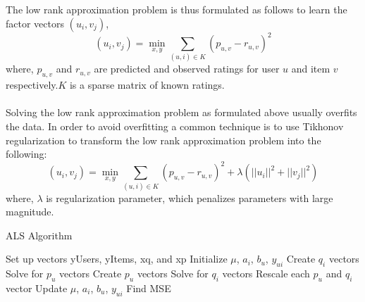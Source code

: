 \documentclass{sig-alternate-05-2015}
\begin{document}
The low rank approximation problem is thus formulated as follows to learn the factor vectors $(u_i, v_j)$,
\begin{equation*}
   (u_i, v_j) = \min_{x, y}\sum_{(u,i)\in K}^{} (p_{u,v}-r_{u,v})^2
\end{equation*}
where, $p_{u,v}$ and $r_{u,v}$ are predicted and observed ratings for user $u$ and item $v$ respectively.$K$ is a sparse matrix of known ratings.\\\\
Solving the low rank approximation problem as formulated above usually overfits the data. In order to avoid overfitting a common technique is to use Tikhonov regularization to transform the low rank approximation problem into the following:
\begin{equation*}
   (u_i, v_j) = \min_{x, y}\sum_{(u,i)\in K}^{} (p_{u,v}-r_{u,v})^2 + \lambda(||u_i||^2+||v_j||^2)
\end{equation*}
where, $\lambda$ is regularization parameter, which penalizes parameters with large magnitude.
\\
\begin{algorithm}
\caption{ALS Algorithm}
\label{CHalgorithm}
\begin{algorithmic}[1]
\State Set up vectors yUsers, yItems, xq, and xp
\State Initialize $\mu$, $a_i$, $b_u$, $y_{ui}$
\State Create $q_i$ vectors
\State    Solve for $p_u$ vectors 
\State Create $p_u$ vectors
\State    Solve for $q_i$ vectors
\State Rescale each $p_u$ and $q_i$ vector 
\State Update $\mu$, $a_i$, $b_u$, $y_{ui}$
\State Find MSE
\EndWhile
\end{algorithmic}
\end{algorithm}
\end{document}
